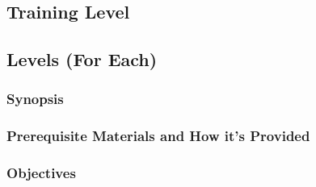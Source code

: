 \documentclass[12pt]{article}
\begin{document}





\subsection{Training Level}

\subsection{Levels (For Each)}

\subsubsection{Synopsis}

\subsubsection{Prerequisite Materials and How it's Provided}

\subsubsection{Objectives}
\end{document}
